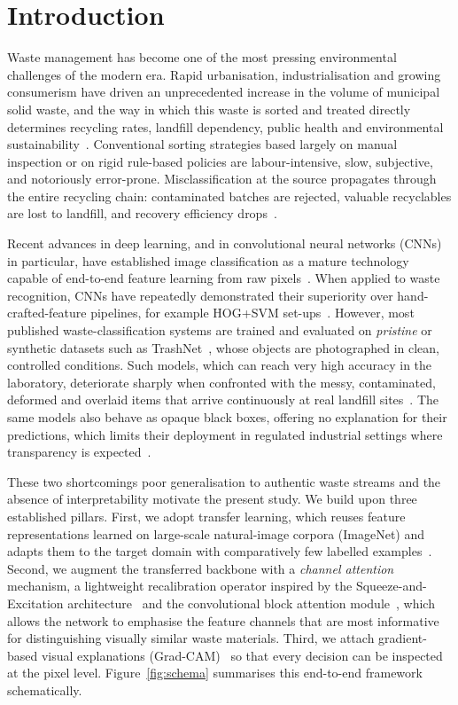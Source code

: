 \documentclass[a4paper,fleqn]{cas-dc}
\begin{document}
\section{Introduction}\label{sec:intro}

Waste management has become one of the most pressing environmental challenges
of the modern era. Rapid urbanisation, industrialisation and growing
consumerism have driven an unprecedented increase in the volume of municipal
solid waste, and the way in which this waste is sorted and treated directly
determines recycling rates, landfill dependency, public health and
environmental sustainability~\cite{realwaste}. Conventional sorting
strategies based largely on manual inspection or on rigid rule-based
policies are labour-intensive, slow, subjective, and notoriously
error-prone. Misclassification at the source propagates through the entire
recycling chain: contaminated batches are rejected, valuable recyclables are
lost to landfill, and recovery efficiency drops~\cite{trashnet,meng_a_study}.

Recent advances in deep learning, and in convolutional neural networks (CNNs)
in particular, have established image classification as a mature technology
capable of end-to-end feature learning from raw pixels~\cite{simonyan_vgg,he_resnet,huang_densenet}.
When applied to waste recognition, CNNs have repeatedly demonstrated their
superiority over hand-crafted-feature pipelines, for example HOG+SVM
set-ups~\cite{meng_a_study}. However, most published waste-classification
systems are trained and evaluated on \emph{pristine} or synthetic datasets
such as TrashNet~\cite{trashnet}, whose objects are photographed in clean,
controlled conditions. Such models, which can reach very high accuracy in the
laboratory, deteriorate sharply when confronted with the messy, contaminated,
deformed and overlaid items that arrive continuously at real landfill
sites~\cite{realwaste,deepwaste}. The same models also behave as opaque
black boxes, offering no explanation for their predictions, which limits
their deployment in regulated industrial settings where transparency is
expected~\cite{selvaraju_gradcam}.

These two shortcomings poor generalisation to authentic waste streams and
the absence of interpretability motivate the present study. We build upon
three established pillars. First, we adopt transfer learning, which reuses
feature representations learned on large-scale natural-image corpora
(ImageNet) and adapts them to the target domain with comparatively few
labelled examples~\cite{pan_transfer}. Second, we augment the transferred
backbone with a \emph{channel attention} mechanism, a lightweight
recalibration operator inspired by the Squeeze-and-Excitation
architecture~\cite{hu_senet} and the convolutional block attention
module~\cite{woo_cbam}, which allows the network to emphasise the feature
channels that are most informative for distinguishing visually similar waste
materials. Third, we attach gradient-based visual explanations
(Grad-CAM)~\cite{selvaraju_gradcam} so that every decision can be inspected
at the pixel level. Figure~\ref{fig:schema} summarises this end-to-end
framework schematically.
\end{document}
